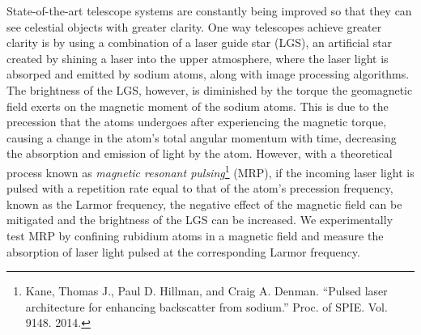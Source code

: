 State-of-the-art telescope systems are constantly being improved so that they can see celestial objects with greater clarity. One way telescopes achieve greater clarity is by using a combination of a laser guide star (LGS), an artificial star created by shining a laser into the upper atmosphere, where the laser light is absorped and emitted by sodium atoms, along with image processing algorithms. The brightness of the LGS, however, is diminished by the torque the geomagnetic field exerts on the magnetic moment of the sodium atoms. This is due to the precession that the atoms undergoes after experiencing the magnetic torque, causing a change in the atom's total angular momentum with time, decreasing the absorption and emission of light by the atom. However, with a theoretical process known as \textit{magnetic resonant pulsing}\footnote{Kane, Thomas J., Paul D. Hillman, and Craig A. Denman. ``Pulsed laser architecture for enhancing backscatter from sodium.'' Proc. of SPIE. Vol. 9148. 2014.} (MRP), if the incoming laser light is pulsed with a repetition rate equal to that of the atom's precession frequency, known as the Larmor frequency, the negative effect of the magnetic field can be mitigated and the brightness of the LGS can be increased. We experimentally test MRP by confining rubidium atoms in a magnetic field and measure the absorption of laser light pulsed at the corresponding Larmor frequency.
